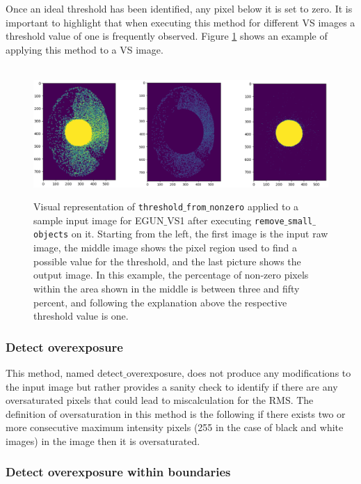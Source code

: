 \documentclass{article}
\begin{document}
Once an ideal threshold has been identified, any pixel below it is set to zero. It is important to highlight that when executing this method for different VS images a threshold value of one is frequently observed. Figure \ref{fig:88} shows an example of applying this method to a VS image.

\begin{figure}[!h]  
    \centerline{\ \includegraphics[width=\linewidth]{images/last_step.png}}
    \caption{Visual representation of \texttt{threshold$\_$from$\_$nonzero} applied to a sample input image for EGUN$\_$VS1 after executing \texttt{remove$\_$small$\_$objects} on it. Starting from the left, the first image is the input raw image, the middle image shows the pixel region used to find a possible value for the threshold, and the last picture shows the output image. In this example, the percentage of non-zero pixels within the area shown in the middle is between three and fifty percent, and following the explanation above the respective threshold value is one.}
    \label{fig:88}
\end{figure} 

\subsubsection{Detect overexposure}

This method, named detect$\_$overexposure, does not produce any modifications to the input image but rather provides a sanity check to identify if there are any oversaturated pixels that could lead to miscalculation for the RMS. The definition of oversaturation in this method is the following if there exists two or more consecutive maximum intensity pixels (255 in the case of black and white images) in the image then it is oversaturated.

\subsubsection{Detect overexposure within boundaries}
\end{document}
